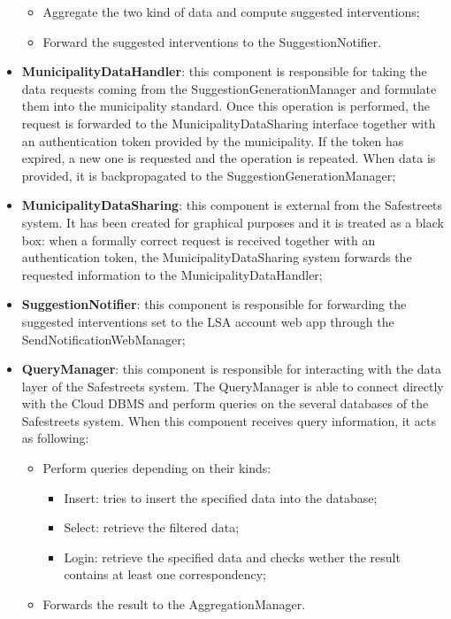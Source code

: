 \begin{itemize}
\begin{itemize}
        \item Aggregate the two kind of data and compute suggested interventions;
        \item Forward the suggested interventions to the SuggestionNotifier.
    \end{itemize}
    \item \textbf{MunicipalityDataHandler}: this component is responsible for taking the data requests coming from the SuggestionGenerationManager and formulate them into the municipality standard. Once this operation is performed, the request is forwarded to the MunicipalityDataSharing interface together with an authentication token provided by the municipality. If the token has expired, a new one is requested and the operation is repeated. When data is provided, it is backpropagated to the SuggestionGenerationManager;
    \item \textbf{MunicipalityDataSharing}: this component is external from the Safestreets system. It has been created for graphical purposes and it is treated as a black box: when a formally correct request is received together with an authentication token, the MunicipalityDataSharing system forwards the requested information to the MunicipalityDataHandler;
    \item \textbf{SuggestionNotifier}: this component is responsible for forwarding the suggested interventions set to the LSA account web app through the SendNotificationWebManager;
    \item \textbf{QueryManager}: this component is responsible for interacting with the data layer of the Safestreets system. The QueryManager is able to connect directly with the Cloud DBMS and perform queries on the several databases of the Safestreets system. When this component receives query information, it acts as following: 
    \begin{itemize}
        \item Perform queries depending on their kinds: 
        \begin{itemize}
            \item Insert: tries to insert the specified data into the database;
            \item Select: retrieve the filtered data;
            \item Login: retrieve the specified data and checks wether the result contains at least one correspondency;
        \end{itemize}
        \item Forwards the result to the AggregationManager.

\end{itemize}
\end{itemize}
